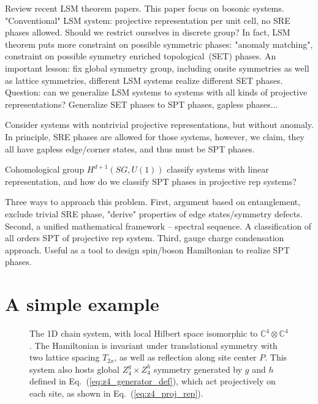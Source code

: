 \documentclass[%
  reprint,
  amsmath,amssymb,
  aps,pra,
]{revtex4-1}
\begin{document}
Review recent LSM theorem papers. This paper focus on bosonic systems.
"Conventional" LSM system: projective representation per unit cell, no SRE phases allowed.
{\color{red} Should we restrict ourselves in discrete group?}
In fact, LSM theorem puts more constraint on possible symmetric phases:  "anomaly matching", constraint on possible symmetry enriched topological~(SET) phases.
An important lesson: fix global symmetry group, including onsite symmetries as well as lattice symmetries, different LSM systems realize different SET phases.
Question: can we generalize LSM systems to systems with all kinds of projective representations? Generalize SET phases to SPT phases, gapless phases...

Consider systems with nontrivial projective representations, but without anomaly.
In principle, SRE phases are allowed for those systems, however, we claim, they all have gapless edge/corner states, and thus must be SPT phases.

Cohomological group $H^{d+1}(SG,U(1))$ classify systems with linear representation, and how do we classify SPT phases in projective rep systems?

Three ways to approach this problem.
First, argument based on entanglement, exclude trivial SRE phase, "derive" properties of edge states/symmetry defects.
Second, a unified mathematical framework -- spectral sequence. A classification of all orders SPT of projective rep system.
Third, gauge charge condensation approach. Useful as a tool to design spin/boson Hamiltonian to realize SPT phases.


\section{A simple example}

\begin{figure}[h]
  \centering
  \caption{The 1D chain system, with local Hilbert space isomorphic to $\mathbb{C}^4\otimes\mathbb{C}^4$. The Hamiltonian is invariant under translational symmetry with two lattice spacing $T_{2x}$, as well as reflection along site center $P$. This system also hosts global $Z_4^g\times Z_4^h$ symmetry generated by $g$ and $h$ defined in Eq.~(\ref{eq:z4_generator_def}), which act projectively on each site, as shown in Eq.~(\ref{eq:z4_proj_rep}).}
  \label{fig:1d_z4z4_spt}
\end{figure}
\end{document}
